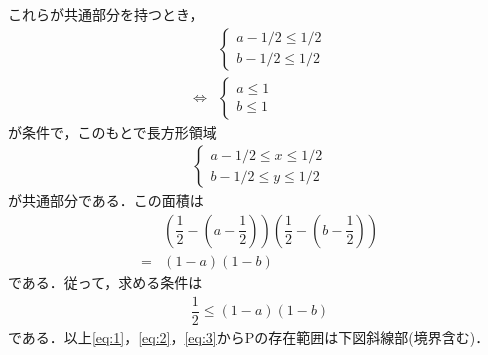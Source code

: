 \documentclass[../../main.tex]{subfiles}
\begin{document}
これらが共通部分を持つとき，
\begin{align}
  &
  \begin{cases}
    a-1/2\le1/2 \\
    b-1/2\le1/2
  \end{cases}\nonumber\\
  \Longleftrightarrow
  &
  \begin{cases}
    a\le 1 \\
    b\le 1
  \end{cases}\label{eq:2}
\end{align}
が条件で，このもとで長方形領域
\begin{align}
  \begin{cases}
    a-1/2\le x\le1/2 \\
    b-1/2\le y\le1/2
  \end{cases}
\end{align}
が共通部分である．この面積は
\begin{align}
  &\left(\dfrac{1}{2}-\left(a-\dfrac{1}{2}\right)\right)\left(\dfrac{1}{2}-\left(b-\dfrac{1}{2}\right)\right) \\
  =&(1-a)(1-b)
\end{align}
である．従って，求める条件は
\begin{align}
  \dfrac{1}{2}\le (1-a)(1-b)\label{eq:3}
\end{align}
である．以上\cref{eq:1}，\cref{eq:2}，\cref{eq:3}からPの存在範囲は下図斜線部(境界含む)．
\end{document}
